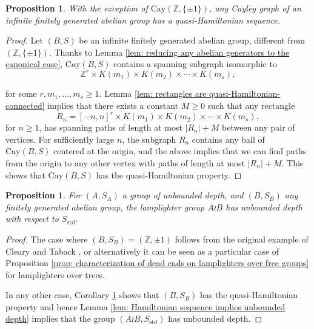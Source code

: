 \documentclass[reqno,oneside]{amsart}
\newcommand{\cay}[2]{\mathrm{Cay}(#1,#2)}
\newcommand{\Z}{\mathbb{Z}}
\newcommand{\std}{S_{\mathrm{std}}}
\theoremstyle{plain}
\newtheorem{prop}[thm]{Proposition}
\theoremstyle{definition}
\begin{document}
\begin{prop}\label{prop: any cayley graph of a fg abelian group has a quasi Hamiltonian sequence} With the exception of $\cay{\Z}{\{\pm 1\}}$, any Cayley graph of an infinite finitely generated abelian group has a quasi-Hamiltonian sequence.
\end{prop}
\begin{proof}
	Let $(B,S)$ be an infinite finitely generated abelian group, different from $(\Z,\{\pm 1\})$. Thanks to Lemma \ref{lem: reducing any abelian generators to the canonical case}, $\cay{B}{S}$ contains a spanning subgraph isomorphic to $$\Z^r\times K(m_1)\times K(m_2)\times \cdots \times K(m_s),$$
	
	
	for some $r,m_1,\ldots,m_s\ge 1$. Lemma \ref{lem: rectangles are quasi-Hamiltonian-connected} implies that there exists a constant $M\ge 0$ such that any rectangle
	$$
	R_n=[-n,n]^r\times K(m_1)\times K(m_2)\times \cdots \times K(m_s),
	$$
	for $n\ge 1$, has spanning paths of length at most $|R_n|+M$ between any pair of vertices. For sufficiently large $n$, the subgraph $R_n$ contains any ball of $\cay{B}{S}$ centered at the origin, and the above implies that we can find paths from the origin to any other vertex with paths of length at most $|R_n|+M$. This shows that $\cay{B}{S}$ has the quasi-Hamiltonian property.
\end{proof}

\begin{prop}\label{prop: any lamplighter over an abelian group has unbounded depth wrt standard gensets} For $(A,S_A)$ a group of unbounded depth, and $(B,S_B)$ any finitely generated abelian group, the lamplighter group $A\wr B$ has unbounded depth with respect to $\std$.
\end{prop}
\begin{proof}
	The case where $(B,S_B)=(\mathbb{Z},{\pm 1})$ follows from the original example of Cleary and Taback \cite{ClearyTaback05}, or alternatively it can be seen as a particular case of Proposition \ref{prop: characterization of dead ends on lamplighters over free groups} for lamplighters over trees.
	
	In any other case, Corollary \ref{prop: any cayley graph of a fg abelian group has a quasi Hamiltonian sequence} shows that $(B,S_B)$ has the quasi-Hamiltonian property and hence Lemma \ref{lem: Hamiltonian sequence implies unbounded depth} implies that the group $(A\wr B,\std)$ has unbounded depth.
\end{proof}


\end{document}
